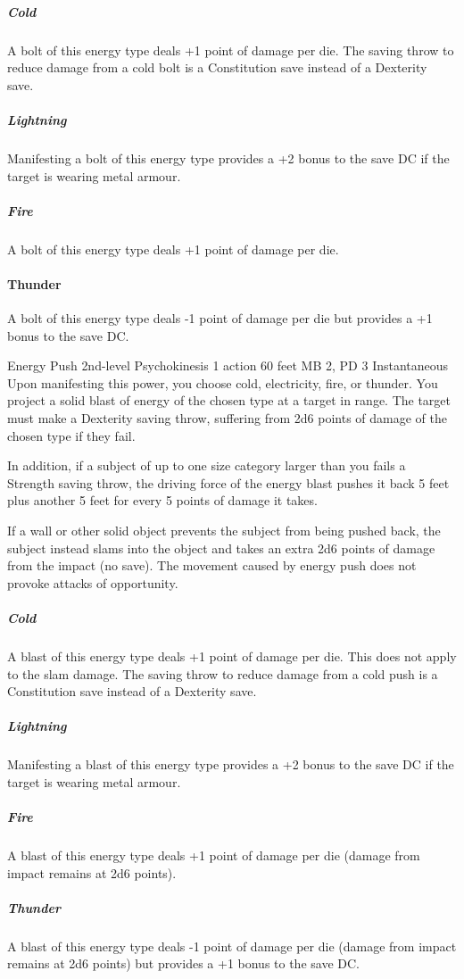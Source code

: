   \subparagraph{Cold}
  A bolt of this energy type deals +1 point of damage per die.
  The saving throw to reduce damage from a cold bolt
  is a Constitution save instead of a Dexterity save.
  
  \subparagraph{Lightning}
  Manifesting a bolt of this energy type provides
  a +2 bonus to the save DC if the target is wearing metal armour.
  
  \subparagraph{Fire}
  A bolt of this energy type deals +1 point of damage per die.
  
  \paragraph{Thunder}
  A bolt of this energy type deals -1 point of damage per die
  but provides a +1 bonus to the save DC.

\DndPowerHeader%
  {Energy Push}
  {2nd-level Psychokinesis}
  {1 action}
  {60 feet}
  {MB 2, PD 3}
  {Instantaneous}
  Upon manifesting this power, you choose cold, electricity, fire, or thunder.
  You project a solid blast of energy of the chosen type at a target in range.
  The target must make a Dexterity saving throw,
  suffering from 2d6 points of damage of the chosen type if they fail.
  
  In addition, if a subject of up to one size category larger than you
  fails a Strength saving throw,
  the driving force of the energy blast pushes it back 5 feet
  plus another 5 feet for every 5 points of damage it takes.
  
  If a wall or other solid object prevents the subject from being pushed back,
  the subject instead slams into the object and takes an extra
  2d6 points of damage from the impact (no save).
  The movement caused by energy push does not provoke attacks of opportunity.
  \subparagraph{Cold}
    A blast of this energy type deals +1 point of damage per die.
    This does not apply to the slam damage.
    The saving throw to reduce damage from a cold push
    is a Constitution save instead of a Dexterity save.
  \subparagraph{Lightning}
    Manifesting a blast of this energy type provides a +2 bonus
    to the save DC if the target is wearing metal armour.
  \subparagraph{Fire}
    A blast of this energy type deals +1 point of damage per die
    (damage from impact remains at 2d6 points).
  \subparagraph{Thunder}
    A blast of this energy type deals -1 point of damage per die
    (damage from impact remains at 2d6 points)
    but provides a +1 bonus to the save DC.

